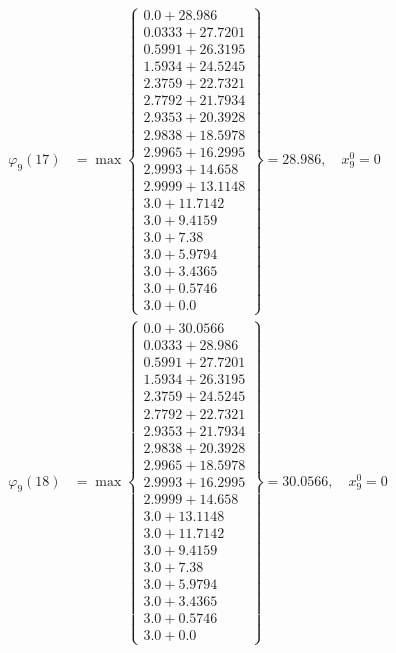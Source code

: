 \documentclass{article}
\begin{document}
\begin{align*}
  
\varphi_{9}(17) &= \max \left\{ \begin{array}{c}
0.0 + 28.986 \\
 0.0333 + 27.7201 \\
 0.5991 + 26.3195 \\
 1.5934 + 24.5245 \\
 2.3759 + 22.7321 \\
 2.7792 + 21.7934 \\
 2.9353 + 20.3928 \\
 2.9838 + 18.5978 \\
 2.9965 + 16.2995 \\
 2.9993 + 14.658 \\
 2.9999 + 13.1148 \\
 3.0 + 11.7142 \\
 3.0 + 9.4159 \\
 3.0 + 7.38 \\
 3.0 + 5.9794 \\
 3.0 + 3.4365 \\
 3.0 + 0.5746 \\
 3.0 + 0.0
\end{array} \right\}=28.986,\quad x_{9}^0=0\\
  
  
  
  
\varphi_{9}(18) &= \max \left\{ \begin{array}{c}
0.0 + 30.0566 \\
 0.0333 + 28.986 \\
 0.5991 + 27.7201 \\
 1.5934 + 26.3195 \\
 2.3759 + 24.5245 \\
 2.7792 + 22.7321 \\
 2.9353 + 21.7934 \\
 2.9838 + 20.3928 \\
 2.9965 + 18.5978 \\
 2.9993 + 16.2995 \\
 2.9999 + 14.658 \\
 3.0 + 13.1148 \\
 3.0 + 11.7142 \\
 3.0 + 9.4159 \\
 3.0 + 7.38 \\
 3.0 + 5.9794 \\
 3.0 + 3.4365 \\
 3.0 + 0.5746 \\
 3.0 + 0.0
\end{array} \right\}=30.0566,\quad x_{9}^0=0\\
  

\end{align*}
\end{document}
